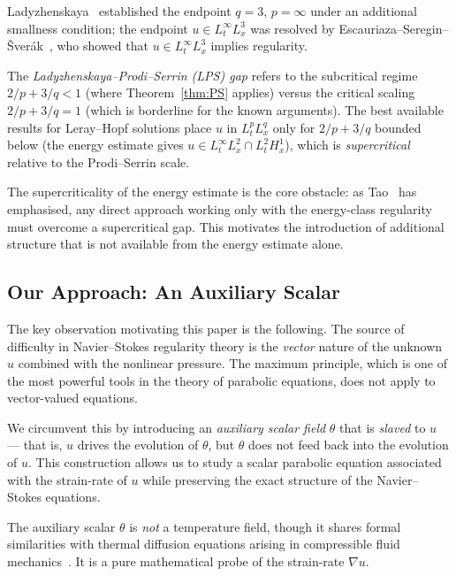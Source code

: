 \documentclass[12pt]{article}
\theoremstyle{definition}
\newcommand{\LpLq}[2]{L^{#1}_t L^{#2}_x}
\begin{document}
Ladyzhenskaya~\cite{Ladyzhenskaya1967} established the endpoint
$q = 3$, $p = \infty$ under an additional smallness condition;
the endpoint $u \in L^\infty_t L^3_x$ was resolved by
Escauriaza--Seregin--\v{S}ver\'{a}k~\cite{ESS2003}, who showed that
$u \in L^\infty_t L^3_x$ implies regularity.

The \emph{Ladyzhenskaya--Prodi--Serrin (LPS) gap} refers to the
subcritical regime $2/p + 3/q < 1$ (where Theorem~\ref{thm:PS} applies)
versus the critical scaling $2/p + 3/q = 1$ (which is borderline for the
known arguments). The best available results for Leray--Hopf solutions place
$u$ in $\LpLq{p}{q}$ only for $2/p + 3/q$ bounded below
(the energy estimate gives $u \in L^\infty_t L^2_x \cap L^2_t H^1_x$),
which is \emph{supercritical} relative to the Prodi--Serrin scale.

The supercriticality of the energy estimate is the core obstacle:
as Tao~\cite{Tao2016} has emphasised, any direct approach working only
with the energy-class regularity must overcome a supercritical gap.
This motivates the introduction of additional structure that is not
available from the energy estimate alone.

\subsection{Our Approach: An Auxiliary Scalar}
\label{subsec:approach}

The key observation motivating this paper is the following. The source of
difficulty in Navier--Stokes regularity theory is the \emph{vector} nature
of the unknown $u$ combined with the nonlinear pressure. The maximum
principle, which is one of the most powerful tools in the theory of parabolic
equations, does not apply to vector-valued equations.

We circumvent this by introducing an \emph{auxiliary scalar field} $\theta$
that is \emph{slaved} to $u$ --- that is, $u$ drives the evolution of
$\theta$, but $\theta$ does not feed back into the evolution of $u$.
This construction allows us to study a scalar parabolic equation associated
with the strain-rate of $u$ while preserving the exact structure of the
Navier--Stokes equations.

The auxiliary scalar $\theta$ is \emph{not} a temperature field, though
it shares formal similarities with thermal diffusion equations arising in
compressible fluid mechanics~\cite{MenonClaude2026}. It is a pure
mathematical probe of the strain-rate $\nabla u$.
\end{document}
